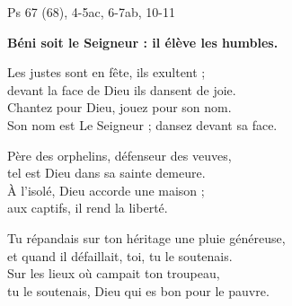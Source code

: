 Ps 67 (68), 4-5ac, 6-7ab, 10-11

\textbf{
Béni soit le Seigneur :
il élève les humbles. 
}

\smallskip

Les justes sont en fête, ils exultent ;\\
devant la face de Dieu ils dansent de joie.\\
Chantez pour Dieu, jouez pour son nom.\\
Son nom est Le Seigneur ; dansez devant sa face.

\smallskip

Père des orphelins, défenseur des veuves,\\
tel est Dieu dans sa sainte demeure.\\
À l’isolé, Dieu accorde une maison ;\\
aux captifs, il rend la liberté.

\smallskip

Tu répandais sur ton héritage une pluie généreuse,\\
et quand il défaillait, toi, tu le soutenais.\\
Sur les lieux où campait ton troupeau,\\
tu le soutenais, Dieu qui es bon pour le pauvre.
